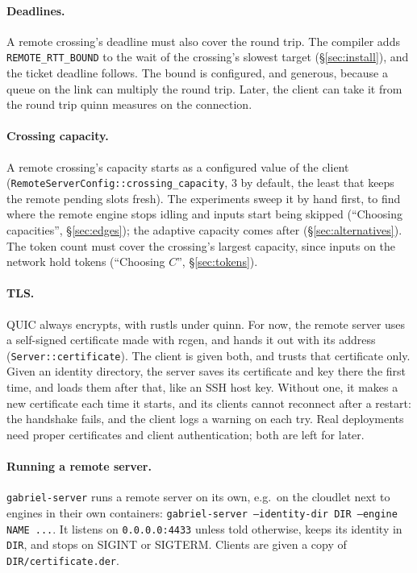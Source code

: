 \documentclass[11pt]{article}
\newcommand{\code}[1]{\texttt{#1}}
\begin{document}
\paragraph{Deadlines.} A remote crossing's deadline must also cover the round
trip. The compiler adds \code{REMOTE\_RTT\_BOUND} to the wait of the
crossing's slowest target (\S\ref{sec:install}), and the ticket deadline
follows. The bound is configured, and generous, because a queue on the link
can multiply the round trip. Later, the client can take it from the round
trip quinn measures on the connection.

\paragraph{Crossing capacity.} A remote crossing's capacity starts as a
configured value of the client (\code{RemoteServerConfig::crossing\_capacity},
3 by default, the least that keeps the remote pending slots fresh). The experiments sweep it by hand first, to
find where the remote engine stops idling and inputs start being skipped
(``Choosing capacities'', \S\ref{sec:edges}); the adaptive capacity
comes after (\S\ref{sec:alternatives}). The token count must cover the
crossing's largest capacity, since inputs on the network hold tokens
(``Choosing $C$'', \S\ref{sec:tokens}).

\paragraph{TLS.} QUIC always encrypts, with rustls under quinn. For now, the
remote server uses a self-signed certificate made with rcgen, and hands it
out with its address (\code{Server::certificate}). The client is given both,
and trusts that certificate only. Given an identity directory, the server
saves its certificate and key there the first time, and loads them after
that, like an SSH host key. Without one, it makes a new certificate each time
it starts, and its clients cannot reconnect after a restart: the handshake
fails, and the client logs a warning on each try. Real
deployments need proper certificates and client authentication; both are
left for later.

\paragraph{Running a remote server.} \code{gabriel-server} runs a remote
server on its own, e.g.\ on the cloudlet next to engines in their own
containers: \code{gabriel-server --identity-dir DIR --engine NAME ...}. It
listens on \code{0.0.0.0:4433} unless told otherwise, keeps its identity in
\code{DIR}, and stops on SIGINT or SIGTERM. Clients are given a copy of
\code{DIR/certificate.der}.
\end{document}
